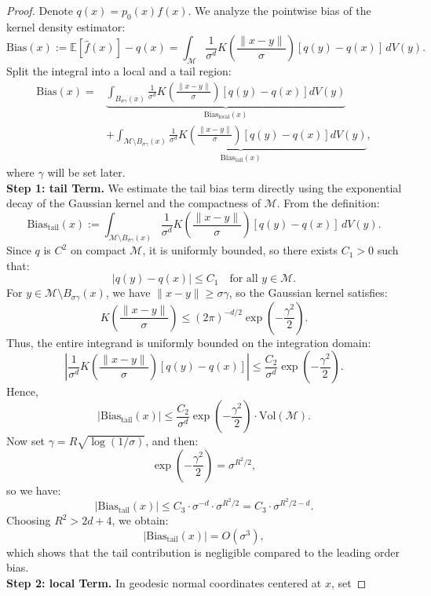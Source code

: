 \documentclass{article}
\begin{document}
\begin{proof}
Denote \( q(x)=p_0(x) f(x)\). 
    We analyze the pointwise bias of the kernel density estimator:
\[
\text{Bias}(x) := \mathbb{E}[\hat{f}(x)] - q(x)
= \int_{\mathcal{M}} \frac{1}{\sigma^d} K\left( \frac{\|x - y\|}{\sigma} \right) [q(y) - q(x)] \, dV(y).
\]
Split the integral into a local and a tail region:
\[
\begin{aligned}
\text{Bias}(x) 
= &\underbrace{\int_{B_{\sigma \gamma}(x)} \frac{1}{\sigma^d} K\left( \frac{\|x - y\|}{\sigma} \right) [q(y) - q(x)] dV(y)}_{\text{Bias}_{\text{local}}(x)} \\
&+ \underbrace{\int_{\mathcal{M} \setminus B_{\sigma \gamma}(x)} \frac{1}{\sigma^d} K\left( \frac{\|x - y\|}{\sigma} \right) [q(y) - q(x)] dV(y)}_{\text{Bias}_{\text{tail}}(x)},
\end{aligned}
\]
where \(\gamma\) will be set later.\\
\textbf{Step 1: tail Term.}
We estimate the tail bias term directly using the exponential decay of the Gaussian kernel and the compactness of \(\mathcal{M}\).
From the definition:
\[
\text{Bias}_{\text{tail}}(x) := \int_{\mathcal{M} \setminus B_{\sigma \gamma}(x)} \frac{1}{\sigma^d} K\left( \frac{\|x - y\|}{\sigma} \right) [q(y) - q(x)] \, dV(y).
\]
Since \(q\) is \(C^2\) on compact \(\mathcal{M}\), it is uniformly bounded, so there exists \(C_1 > 0\) such that:
\[
|q(y) - q(x)| \le C_1 \quad \text{for all } y \in \mathcal{M}.
\]
For \(y \in \mathcal{M} \setminus B_{\sigma \gamma}(x)\), we have \(\|x - y\| \ge \sigma \gamma\), so the Gaussian kernel satisfies:
\[
K\left( \frac{\|x - y\|}{\sigma} \right) \le (2\pi)^{-d/2} \exp\left( -\frac{\gamma^2}{2} \right).
\]
Thus, the entire integrand is uniformly bounded on the integration domain:
\[
\left| \frac{1}{\sigma^d} K\left( \frac{\|x - y\|}{\sigma} \right) [q(y) - q(x)] \right| \le \frac{C_2}{\sigma^d} \exp\left( -\frac{\gamma^2}{2} \right).
\]
Hence,
\[
|\text{Bias}_{\text{tail}}(x)| \le \frac{C_2}{\sigma^d} \exp\left( -\frac{\gamma^2}{2} \right) \cdot \mathrm{Vol}(\mathcal{M}).
\]
Now set \( \gamma = R \sqrt{\log(1/\sigma)} \), and then:
\[
\exp\left( -\frac{\gamma^2}{2} \right) = \sigma^{R^2/2},
\]
so we have:
\[
|\text{Bias}_{\text{tail}}(x)| \le C_3 \cdot \sigma^{-d} \cdot \sigma^{R^2/2} = C_3 \cdot \sigma^{R^2/2 - d}.
\]
Choosing \(R^2 > 2d + 4\), we obtain:
\[
|\text{Bias}_{\text{tail}}(x)| =  O(\sigma^3),
\]
which shows that the tail contribution is negligible compared to the leading order bias.\\
\textbf{Step 2: local Term.}
In geodesic normal coordinates centered at \(x\), set 

\end{proof}
\end{document}
